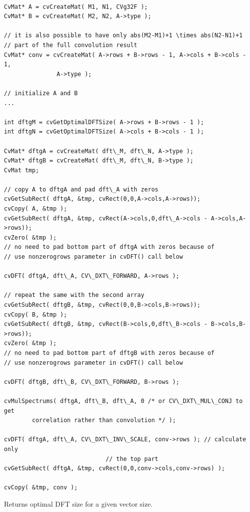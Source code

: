 \begin{lstlisting}

CvMat* A = cvCreateMat( M1, N1, CVg32F );
CvMat* B = cvCreateMat( M2, N2, A->type );

// it is also possible to have only abs(M2-M1)+1 \times abs(N2-N1)+1
// part of the full convolution result
CvMat* conv = cvCreateMat( A->rows + B->rows - 1, A->cols + B->cols - 1, 
			   A->type );

// initialize A and B
...

int dftgM = cvGetOptimalDFTSize( A->rows + B->rows - 1 );
int dftgN = cvGetOptimalDFTSize( A->cols + B->cols - 1 );

CvMat* dftgA = cvCreateMat( dft\_M, dft\_N, A->type );
CvMat* dftgB = cvCreateMat( dft\_M, dft\_N, B->type );
CvMat tmp;

// copy A to dftgA and pad dft\_A with zeros
cvGetSubRect( dftgA, &tmp, cvRect(0,0,A->cols,A->rows));
cvCopy( A, &tmp );
cvGetSubRect( dftgA, &tmp, cvRect(A->cols,0,dft\_A->cols - A->cols,A->rows));
cvZero( &tmp );
// no need to pad bottom part of dftgA with zeros because of
// use nonzerogrows parameter in cvDFT() call below

cvDFT( dftgA, dft\_A, CV\_DXT\_FORWARD, A->rows );

// repeat the same with the second array
cvGetSubRect( dftgB, &tmp, cvRect(0,0,B->cols,B->rows));
cvCopy( B, &tmp );
cvGetSubRect( dftgB, &tmp, cvRect(B->cols,0,dft\_B->cols - B->cols,B->rows));
cvZero( &tmp );
// no need to pad bottom part of dftgB with zeros because of
// use nonzerogrows parameter in cvDFT() call below

cvDFT( dftgB, dft\_B, CV\_DXT\_FORWARD, B->rows );

cvMulSpectrums( dftgA, dft\_B, dft\_A, 0 /* or CV\_DXT\_MUL\_CONJ to get 
		correlation rather than convolution */ );

cvDFT( dftgA, dft\_A, CV\_DXT\_INV\_SCALE, conv->rows ); // calculate only 
							 // the top part
cvGetSubRect( dftgA, &tmp, cvRect(0,0,conv->cols,conv->rows) );

cvCopy( &tmp, conv );

\end{lstlisting}

\label{GetOptimalDFTSize}

Returns optimal DFT size for a given vector size.


